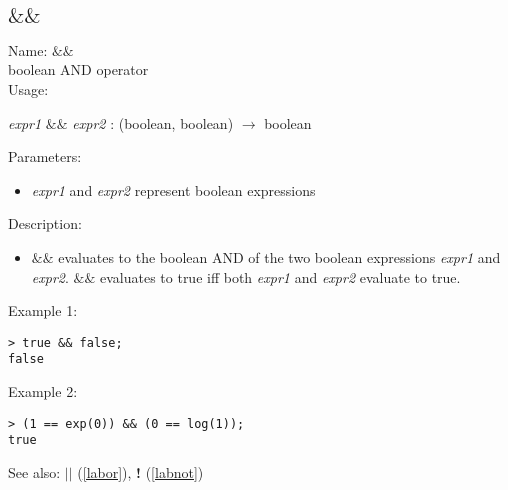 \subsection{$\&\&$}
\label{laband}
\noindent Name: \textbf{$\&\&$}\\
boolean AND operator\\
\noindent Usage: 
\begin{center}
\emph{expr1} \textbf{$\&\&$} \emph{expr2} : (\textsf{boolean}, \textsf{boolean}) $\rightarrow$ \textsf{boolean}\\
\end{center}
Parameters: 
\begin{itemize}
\item \emph{expr1} and \emph{expr2} represent boolean expressions
\end{itemize}
\noindent Description: \begin{itemize}

\item \textbf{$\&\&$} evaluates to the boolean AND of the two
   boolean expressions \emph{expr1} and \emph{expr2}. \textbf{$\&\&$} evaluates to 
   true iff both \emph{expr1} and \emph{expr2} evaluate to true.
\end{itemize}
\noindent Example 1: 
\begin{center}\begin{minipage}{15cm}\begin{Verbatim}[frame=single]
> true && false;
false
\end{Verbatim}
\end{minipage}\end{center}
\noindent Example 2: 
\begin{center}\begin{minipage}{15cm}\begin{Verbatim}[frame=single]
> (1 == exp(0)) && (0 == log(1));
true
\end{Verbatim}
\end{minipage}\end{center}
See also: \textbf{$||$} (\ref{labor}), \textbf{!} (\ref{labnot})
